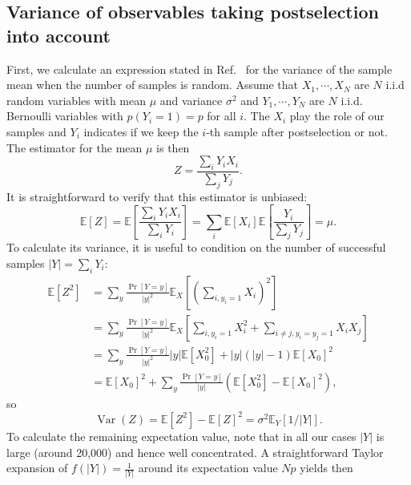 \documentclass[aps,prb,twoside,superscriptaddress,longbibliography,nofootinbib,floatfix, notitlepage,twocolumn]{revtex4-1}
\begin{document}
{\subsection{Variance of observables taking postselection into account}
\label{sec:variance_postselection}
First, we calculate an expression stated in Ref.~\cite{marciniak99} for the variance of the sample mean when the number of samples is random.
Assume that $X_1, \cdots, X_N$ are $N$ i.i.d random variables with mean $\mu$ and variance $\sigma^2$ and $Y_1, \cdots, Y_N$ are $N$ i.i.d. Bernoulli variables with $p(Y_i = 1) = p$ for all $i$. The $X_i$ play the role of our samples and $Y_i$ indicates if we keep the $i$-th sample after postselection or not. The estimator for the mean $\mu$ is then
\begin{equation}
    Z = \frac{\sum_i Y_i X_i}{\sum_j Y_j}.    
\end{equation}
It is straightforward to verify that this estimator is unbiased:
\begin{equation}
    \mathds{E}[Z] = \mathds{E}\left[ \frac{\sum_i Y_i X_i}{\sum_i Y_i}\right] 
                  = \sum_i \mathds{E}[X_i] \mathds{E}\left[ \frac{Y_i}{\sum_j Y_j}\right] 
                  = \mu.
\end{equation}
To calculate its variance, it is useful to condition on the number of successful samples
$|Y| = \sum_i Y_i$:
\begin{equation}
\begin{aligned}
\mathds{E}[Z^2] &= \sum_y \frac{\Pr[Y=y]}{|y|^2} \mathds{E}_X[(\sum_{i,y_i=1} X_i)^2]\\
&= \sum_y \frac{\Pr[Y=y]}{|y|^2} \mathds{E}_X[\sum_{i,y_i=1} X_i^2 + \sum_{i\neq j, y_i=y_j=1} X_iX_j ]\\
&= \sum_y \frac{\Pr[Y=y]}{|y|^2} |y| \mathds{E}[X_0^2] + |y|(|y|-1) \mathds{E}[X_0]^2 \\
&= \mathds{E}[X_0]^2 + \sum_y \frac{\Pr[Y=y]}{|y|} ( \mathds{E}[X_0^2] - \mathds{E}[X_0]^2),
\end{aligned}
\end{equation}
%
so
%
\begin{equation}
    \operatorname{Var}(Z) = \mathds{E}[Z^2] - \mathds{E}[Z]^2 = \sigma^2 \mathds{E}_Y[1/|Y|].
\end{equation}
%
To calculate the remaining expectation value, note that in all our cases $|Y|$ is large
(around 20,000) and hence well concentrated. A straightforward Taylor expansion of 
$f(|Y|) = \frac{1}{|Y|}$ around its expectation value $Np$ yields then
}
\end{document}
